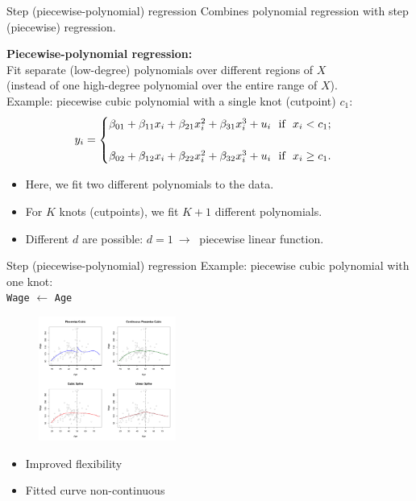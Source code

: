 \documentclass{beamer}
\begin{document}
\begin{frame}{Step (piecewise-polynomial) regression}
Combines polynomial regression with step (piecewise) regression.

\bigskip
\textbf{Piecewise-polynomial regression:} \\Fit separate (low-degree) polynomials over different regions of $X$ \\(instead of one high-degree polynomial over the entire range of $X$). \\ \bigskip
Example: piecewise cubic polynomial with a single knot (cutpoint) $c_1$:
\medskip
\begin{equation*}
y_i = 
    \begin{cases}
        \beta_{01} + \beta_{11} x_i + \beta_{21} x_i^2 + \beta_{31} x_i^3 + u_i \textnormal{~~if~~} x_i <  c_1 ;& \\ ~ & \\
         \beta_{02} + \beta_{12} x_i + \beta_{22} x_i^2 + \beta_{32} x_i^3 + u_i \textnormal{~~if~~} x_i \geq  c_1 .& 
    \end{cases}
\end{equation*}
\medskip
\begin{itemize}
    \item Here, we fit two different polynomials to the data.
    \smallskip
    \item For $K$ knots (cutpoints), we fit $K+1$ different polynomials.
    \smallskip
    \item Different $d$ are possible: $d=1~\rightarrow~$ piecewise linear function.
\end{itemize}
\end{frame}
\begin{frame}{Step (piecewise-polynomial) regression}
Example: piecewise cubic polynomial with one knot:\\
\centering
\medskip
\texttt{Wage} $\leftarrow$ \texttt{Age}\\
\vspace{-0.2cm}
\begin{figure}
  \centering
  \includegraphics[trim=0cm 9.5cm 10.5cm 0cm, clip=true, width=0.4\textwidth]{IMG/ISLR73.pdf}
\end{figure}

\vspace{-0.5cm}
\begin{itemize}
    \item[\ding{51}] Improved flexibility
    \item[\ding{55}] Fitted curve non-continuous
\end{itemize}
\end{frame}
\end{document}
